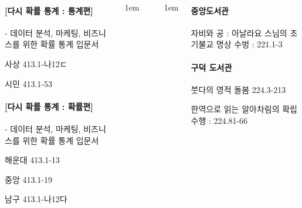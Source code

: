 \documentclass[	20pt, 
							a1paper, 
							portrait, %
							margin=0mm, %
							innermargin=10mm,  		%
							blockverticalspace=4mm, %
							colspace=5mm, 
							subcolspace=0mm
							]{tikzposter}
\begin{document}
\begin{columns}
{\begin{LARGE}
\paragraph{[다시 확률 통계 : 통계편]}
 - 데이터 분석, 마케팅, 비즈니스를 위한 확률 통계 입문서

사상    413.1-나12ㄷ

시민   413.1-53


\paragraph{[다시 확률 통계 : 확률편]}
 - 데이터 분석, 마케팅, 비즈니스를 위한 확률 통계 입문서

해운대  413.1-13

중앙   413.1-19

남구  413.1-나12다  


				\end{LARGE}
			} %




			{
					\setlength{\leftmargini}{4em}
					\setlength{\labelsep} {1em}
				\begin{LARGE}



				\end{LARGE}
			} %

			{
					\setlength{\leftmargini}{4em}
					\setlength{\labelsep} {1em}
				\begin{LARGE}

		\paragraph{중앙도서관}

		자비와 공 : 아날라요 스님의 초기불교 명상 수벙 : 221.1-3

		\paragraph{		구덕 도서관}

		붓다의 영적 돌봄 224.3-213

		한역으로 읽는 알아차림의 확립 수행 : 224.81-66


\end{LARGE}}
\end{columns}
\end{document}
